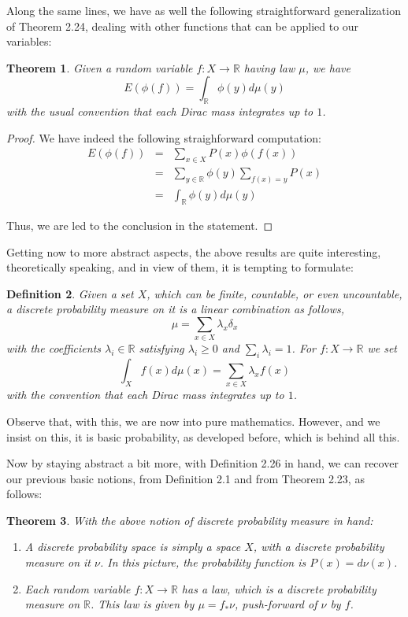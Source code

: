 \documentclass[12pt]{amsbook}
\newtheorem{theorem}{Theorem}[chapter]
\newtheorem{definition}[theorem]{Definition}
\begin{document}
Along the same lines, we have as well the following straightforward generalization of Theorem 2.24, dealing with other functions that can be applied to our variables:

\begin{theorem}
Given a random variable $f:X\to\mathbb R$ having law $\mu$, we have
$$E(\phi(f))=\int_\mathbb R\phi(y)d\mu(y)$$
with the usual convention that each Dirac mass integrates up to $1$.
\end{theorem}

\begin{proof}
We have indeed the following straighforward computation:
\begin{eqnarray*}
E(\phi(f))
&=&\sum_{x\in X}P(x)\phi(f(x))\\
&=&\sum_{y\in\mathbb R}\phi(y)\sum_{f(x)=y}P(x)\\
&=&\int_\mathbb R\phi(y)d\mu(y)
\end{eqnarray*}

Thus, we are led to the conclusion in the statement.
\end{proof}

Getting now to more abstract aspects, the above results are quite interesting, theoretically speaking, and in view of them, it is tempting to formulate:


\begin{definition}
Given a set $X$, which can be finite, countable, or even uncountable, a discrete probability measure on it is a linear combination as follows,
$$\mu=\sum_{x\in X}\lambda_x\delta_x$$
with the coefficients $\lambda_i\in\mathbb R$ satisfying $\lambda_i\geq0$ and $\sum_i\lambda_i=1$. For $f:X\to\mathbb R$ we set
$$\int_Xf(x)d\mu(x)=\sum_{x\in X}\lambda_xf(x)$$
with the convention that each Dirac mass integrates up to $1$.
\end{definition}

Observe that, with this, we are now into pure mathematics. However, and we insist on this, it is basic probability, as developed before, which is behind all this.

\bigskip

Now by staying abstract a bit more, with Definition 2.26 in hand, we can recover our previous basic notions, from Definition 2.1 and from Theorem 2.23, as follows:


\begin{theorem}
With the above notion of discrete probability measure in hand:
\begin{enumerate}
\item A discrete probability space is simply a space $X$, with a discrete probability measure on it $\nu$. In this picture, the probability function is $P(x)=d\nu(x)$.

\item Each random variable $f:X\to\mathbb R$ has a law, which is a discrete probability measure on $\mathbb R$. This law is given by $\mu=f_*\nu$, push-forward of $\nu$ by $f$.
\end{enumerate}
\end{theorem}
\end{document}

